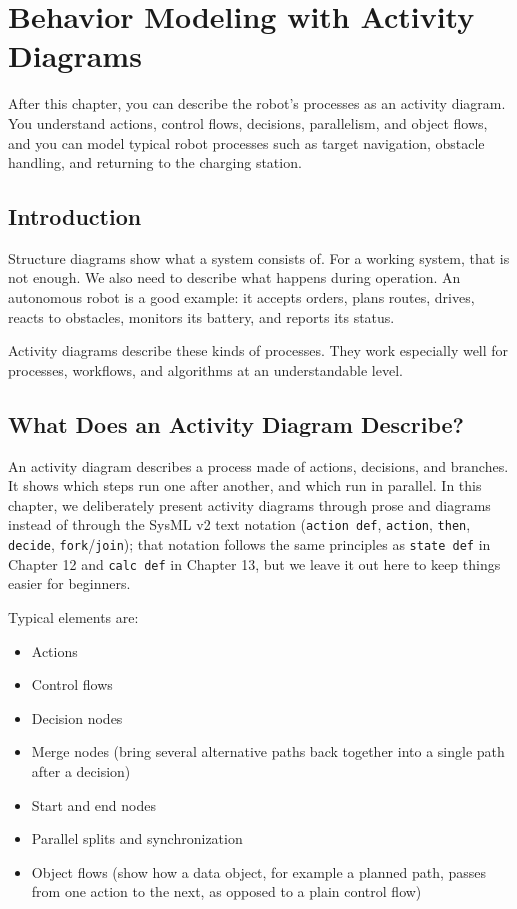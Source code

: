 \chapter{Behavior Modeling with Activity Diagrams}

\begin{lernziele}
After this chapter, you can describe the robot's processes as an activity diagram. You understand actions, control flows, decisions, parallelism, and object flows, and you can model typical robot processes such as target navigation, obstacle handling, and returning to the charging station.
\end{lernziele}

\section{Introduction}
Structure diagrams show what a system consists of. For a working system, that is not enough. We also need to describe what happens during operation. An autonomous robot is a good example: it accepts orders, plans routes, drives, reacts to obstacles, monitors its battery, and reports its status.

Activity diagrams describe these kinds of processes. They work especially well for processes, workflows, and algorithms at an understandable level.

\section{What Does an Activity Diagram Describe?}
An activity diagram describes a process made of actions, decisions, and branches. It shows which steps run one after another, and which run in parallel. In this chapter, we deliberately present activity diagrams through prose and diagrams instead of through the SysML v2 text notation (\texttt{action def}, \texttt{action}, \texttt{then}, \texttt{decide}, \texttt{fork}/\texttt{join}); that notation follows the same principles as \texttt{state def} in Chapter 12 and \texttt{calc def} in Chapter 13, but we leave it out here to keep things easier for beginners.

Typical elements are:

\begin{itemize}
    \item Actions
    \item Control flows
    \item Decision nodes
    \item Merge nodes (bring several alternative paths back together into a single path after a decision)
    \item Start and end nodes
    \item Parallel splits and synchronization
    \item Object flows (show how a data object, for example a planned path, passes from one action to the next, as opposed to a plain control flow)
\end{itemize}

